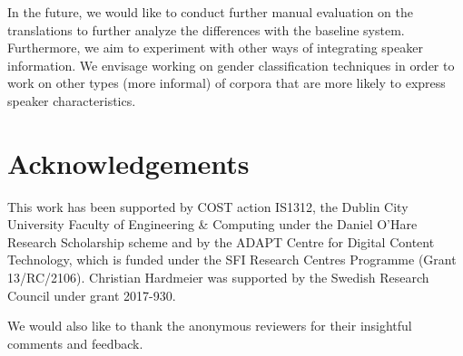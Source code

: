 In the future, we would like to conduct further manual evaluation on the translations to further analyze the differences with the baseline system. Furthermore, we aim to experiment with other ways of integrating speaker information. We envisage working on gender classification techniques in order to work on other types (more informal) of corpora that are more likely to express speaker characteristics.

\section*{Acknowledgements}\label{sec:ack}

This work has been supported by COST action IS1312, the Dublin City University Faculty of Engineering \& Computing under the Daniel O'Hare Research Scholarship scheme and by the ADAPT Centre for Digital Content Technology, which is funded under the SFI Research  Centres  Programme (Grant  13/RC/2106). Christian Hardmeier was supported by the Swedish Research Council under grant 2017-930.

We would also like to thank the anonymous reviewers for their insightful comments and feedback.







